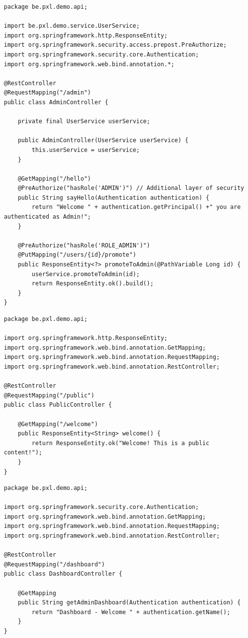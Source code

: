 \begin{lstlisting}
package be.pxl.demo.api;

import be.pxl.demo.service.UserService;
import org.springframework.http.ResponseEntity;
import org.springframework.security.access.prepost.PreAuthorize;
import org.springframework.security.core.Authentication;
import org.springframework.web.bind.annotation.*;

@RestController
@RequestMapping("/admin")
public class AdminController {

    private final UserService userService;

    public AdminController(UserService userService) {
        this.userService = userService;
    }

    @GetMapping("/hello")
    @PreAuthorize("hasRole('ADMIN')") // Additional layer of security
    public String sayHello(Authentication authentication) {
        return "Welcome " + authentication.getPrincipal() +" you are authenticated as Admin!";
    }

    @PreAuthorize("hasRole('ROLE_ADMIN')")
    @PutMapping("/users/{id}/promote")
    public ResponseEntity<?> promoteToAdmin(@PathVariable Long id) {
        userService.promoteToAdmin(id);
        return ResponseEntity.ok().build();
    }
}
\end{lstlisting}

\begin{lstlisting}
package be.pxl.demo.api;

import org.springframework.http.ResponseEntity;
import org.springframework.web.bind.annotation.GetMapping;
import org.springframework.web.bind.annotation.RequestMapping;
import org.springframework.web.bind.annotation.RestController;

@RestController
@RequestMapping("/public")
public class PublicController {

    @GetMapping("/welcome")
    public ResponseEntity<String> welcome() {
        return ResponseEntity.ok("Welcome! This is a public content!");
    }
}
\end{lstlisting}

\begin{lstlisting}
package be.pxl.demo.api;

import org.springframework.security.core.Authentication;
import org.springframework.web.bind.annotation.GetMapping;
import org.springframework.web.bind.annotation.RequestMapping;
import org.springframework.web.bind.annotation.RestController;

@RestController
@RequestMapping("/dashboard")
public class DashboardController {

    @GetMapping
    public String getAdminDashboard(Authentication authentication) {
        return "Dashboard - Welcome " + authentication.getName();
    }
}
\end{lstlisting}




